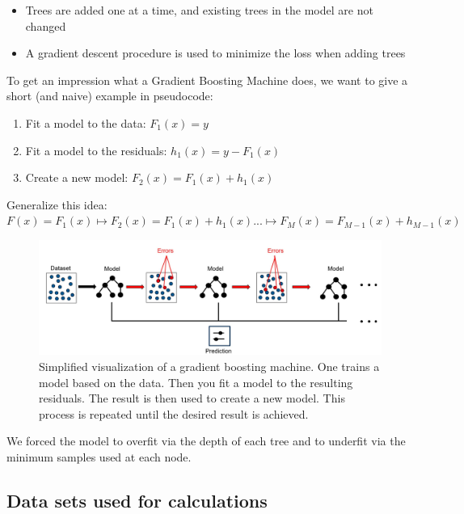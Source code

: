 \documentclass[
]{krantz}
\providecommand{\tightlist}{%
  \setlength{\itemsep}{0pt}\setlength{\parskip}{0pt}}
\begin{document}
\begin{itemize}
\tightlist
\item
  Trees are added one at a time, and existing trees in the model are not changed
\item
  A gradient descent procedure is used to minimize the loss when adding trees
\end{itemize}

To get an impression what a Gradient Boosting Machine does, we want to give a short (and naive) example in pseudocode:

\begin{enumerate}
\def\labelenumi{\arabic{enumi}.}
\tightlist
\item
  Fit a model to the data: \(F_1(x)=y\)
\item
  Fit a model to the residuals: \(h_1(x)=y-F_1(x)\)
\item
  Create a new model: \(F_2(x)=F_1(x)+h_1(x)\)
\end{enumerate}

Generalize this idea:
\(F(x)=F_1(x)\mapsto F_2(x)=F_1(x)+h_1(x) ... \mapsto F_M(x)=F_{M-1}(x)+h_{M-1}(x)\)

\begin{figure}

{\centering \includegraphics[width=0.7\linewidth]{images/ExampleGBM2} 

}

\caption{Simplified visualization of a gradient boosting machine. One trains a model based on the data. Then you fit a model to the resulting residuals. The result is then used to create a new model. This process is repeated until the desired result is achieved.}\label{fig:unnamed-chunk-46}
\end{figure}

We forced the model to overfit via the depth of each tree and to underfit via the minimum samples used at each node.

\hypertarget{data-sets-used-for-calculations}{%
\subsection{Data sets used for calculations}\label{data-sets-used-for-calculations}}
\end{document}
